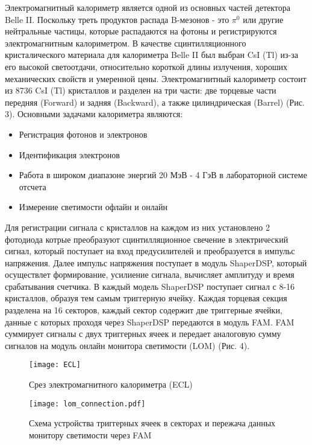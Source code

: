   Электромагнитный калориметр является одной из основных частей детектора Belle II. Поскольку треть продуктов распада B-мезонов - это $\pi^0$ или другие нейтральные частицы, которые распадаются на фотоны и регистрируются электромагнитным калориметром. В качестве сцинтилляционного кристалического материала для калориметра Belle II был выбран CsI (Tl) из-за его высокой светоотдачи, относительно короткой длины излучения, хороших механических свойств и умеренной цены. Электромагнитный калориметр состоит из 8736 CsI (Tl) кристаллов и разделен на три части: две торцевые части передняя (Forward) и задняя (Backward), а также цилиндрическая (Barrel) (Рис. 3).
Основными задачами калориметра являются:
\begin{itemize}
  \item Регистрация фотонов и электронов
  \item Идентификация электронов
  \item Работа в широком диапазоне энергий 20 МэВ - 4 ГэВ в лабораторной системе отсчета
  \item Измерение светимости офлайн и онлайн
\end{itemize}\par
  Для регистрации сигнала с кристаллов на каждом из них установлено 2 фотодиода котрые преобразуют сцинтилляционное свечение в электрический сигнал, который поступает на вход предусилителей и преобразуется в импульс напряжения. Далее импульс напряжения поступает в модуль ShaperDSP, который осуществлет формирование, усилиение сигнала, вычисляет амплитуду и время срабатывания счетчика. В каждый модель ShaperDSP поступает сигнал с 8-16 кристаллов, образуя тем самым триггерную ячейку. Каждая торцевая секция разделена на 16 секторов, каждый сектор содержит две триггерные ячейки, данные с которых проходя через ShaperDSP передаются в модуль FAM. FAM суммирует сигналы с двух триггерных ячеек и передает аналоговую сумму сигналов на модуль онлайн монитора светимости (LOM) (Рис. 4).
\begin{figure}
\centering
\begin{minipage}[t]{.5\textwidth}
  \centering
  \texttt{[image: ECL]}
  \caption{Срез электромагнитного калориметра (ECL)}
  \label{fig:test1}
\end{minipage}%
\begin{minipage}[t]{.5\textwidth}
  \centering
  \texttt{[image: lom\_connection.pdf]}
  \caption{Схема устройства триггерных ячеек в секторах и пережача данных монитору светимости через FAM}
  \label{fig:test2}
\end{minipage}
\end{figure}
